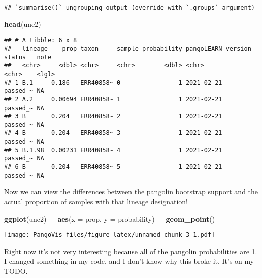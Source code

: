 \documentclass[]{article}
\newenvironment{Shaded}{\begin{snugshade}}{\end{snugshade}}
\newcommand{\DataTypeTok}[1]{\textcolor[rgb]{0.13,0.29,0.53}{#1}}
\newcommand{\KeywordTok}[1]{\textcolor[rgb]{0.13,0.29,0.53}{\textbf{#1}}}
\newcommand{\NormalTok}[1]{#1}
\newcommand{\OperatorTok}[1]{\textcolor[rgb]{0.81,0.36,0.00}{\textbf{#1}}}
\newcommand{\StringTok}[1]{\textcolor[rgb]{0.31,0.60,0.02}{#1}}
\begin{document}
\begin{verbatim}
## `summarise()` ungrouping output (override with `.groups` argument)
\end{verbatim}

\begin{Shaded}
\begin{Highlighting}[]
\KeywordTok{head}\NormalTok{(unc2)}
\end{Highlighting}
\end{Shaded}

\begin{verbatim}
## # A tibble: 6 x 8
##   lineage    prop taxon     sample probability pangoLEARN_version status   note 
##   <chr>     <dbl> <chr>     <chr>        <dbl> <chr>              <chr>    <lgl>
## 1 B.1     0.186   ERR40858~ 0                1 2021-02-21         passed_~ NA   
## 2 A.2     0.00694 ERR40858~ 1                1 2021-02-21         passed_~ NA   
## 3 B       0.204   ERR40858~ 2                1 2021-02-21         passed_~ NA   
## 4 B       0.204   ERR40858~ 3                1 2021-02-21         passed_~ NA   
## 5 B.1.98  0.00231 ERR40858~ 4                1 2021-02-21         passed_~ NA   
## 6 B       0.204   ERR40858~ 5                1 2021-02-21         passed_~ NA
\end{verbatim}

Now we can view the differences between the pangolin bootstrap support
and the actual proportion of samples with that lineage designation!

\begin{Shaded}
\begin{Highlighting}[]
\KeywordTok{ggplot}\NormalTok{(unc2) }\OperatorTok{+}\StringTok{ }
\StringTok{    }\KeywordTok{aes}\NormalTok{(}\DataTypeTok{x =}\NormalTok{ prop, }\DataTypeTok{y =}\NormalTok{ probability) }\OperatorTok{+}\StringTok{ }
\StringTok{    }\KeywordTok{geom_point}\NormalTok{()}
\end{Highlighting}
\end{Shaded}

\texttt{[image: PangoVis\_files/figure-latex/unnamed-chunk-3-1.pdf]}

Right now it's not very interesting because all of the pangolin
probabilities are 1. I changed something in my code, and I don't know
why this broke it. It's on my TODO.
\end{document}

